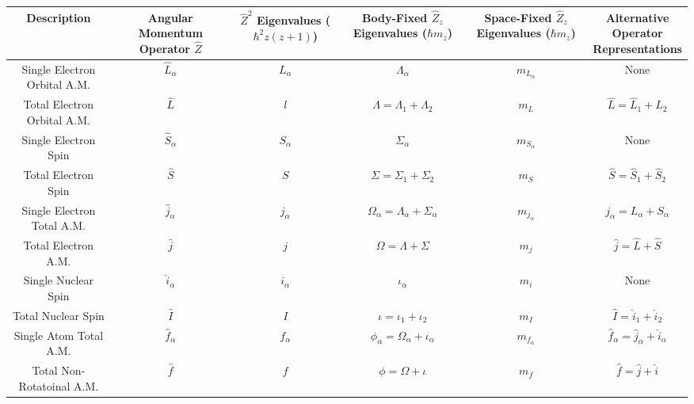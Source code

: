 \documentclass[prl, longbibliography]{revtex4-2}
\begin{document}
\begin{center}
\begin{tabular}{ ||c|c|c|c|c|c||  }
 \hline
 Description & \makecell{Angular \\Momentum \\Operator $\hat{Z}$} & \makecell{$\hat{Z}^2$ Eigenvalues \\($\hbar^2 z(z+1)$)} & \makecell{Body-Fixed\\ $\hat{Z}_z$ Eigenvalues \\($\hbar m_z$)} &\makecell{Space-Fixed\\ $\hat{Z}_z$ Eigenvalues \\($\hbar m_z$)} & \makecell{Alternative\\Operator\\Representations}\\
 \hline
 \hline
 Single Electron Orbital A.M. & $\hat{L}_\alpha$ & $L_\alpha$ & $\Lambda_\alpha$ & $m_{L_\alpha} $ & None \\
 \hline
 Total Electron Orbital A.M. & $\hat{L}$ & $l$ & $\Lambda=\Lambda_1+\Lambda_2$ &$m_L $ & $\hat{L}=\hat{L}_1 + \hat{L}_2$ \\
 \hline
 Single Electron Spin & $\hat{S}_\alpha$ & $S_\alpha$ & $\Sigma_\alpha$ &$m_{S_\alpha} $ & None \\
 \hline
 Total Electron Spin & $\hat{S}$ & $S$ & $\Sigma=\Sigma_1+\Sigma_2$ &$m_S $ &  $\hat{S}=\hat{S}_1 + \hat{S}_2$ \\
 \hline
 Single Electron Total A.M. & $\hat{j}_\alpha$ & $j_\alpha$ & $\Omega_\alpha=\Lambda_\alpha+\Sigma_\alpha$ &$m_{j_\alpha} $ &  $j_\alpha = L_\alpha+S_\alpha$ \\
 \hline
 Total Electron A.M. & $\hat{j}$ & $j$ & $\Omega=\Lambda+\Sigma$ &$m_j $  & $\hat{j} = \hat{L}+\hat{S}$ \\
 \hline
 Single Nuclear Spin & $\hat{i}_\alpha$ & $i_\alpha$ & $\iota_{\alpha}$ &$m_i $ &  None \\
 \hline
 Total Nuclear Spin & $\hat{I}$ & $I$ & $\iota=\iota_1+\iota_2$ &$m_I $ &  $\hat{I}=\hat{i}_1+\hat{i}_2$ \\
 \hline
  Single Atom Total A.M. & $\hat{f}_\alpha$ & $f_\alpha$ & $\phi_\alpha=\Omega_\alpha+\iota_{\alpha}$ &  $m_{f_\alpha} $& $\hat{f}_\alpha=\hat{j}_\alpha+\hat{i}_\alpha$ \\
 \hline
   Total Non-Rotatoinal A.M. & $\hat{f}$ & $f$ & $\phi=\Omega+\iota$ &  $m_f $& $\hat{f}=\hat{j}+\hat{i}$ \\
 \hline
\end{tabular}
\end{center}
\end{document}
